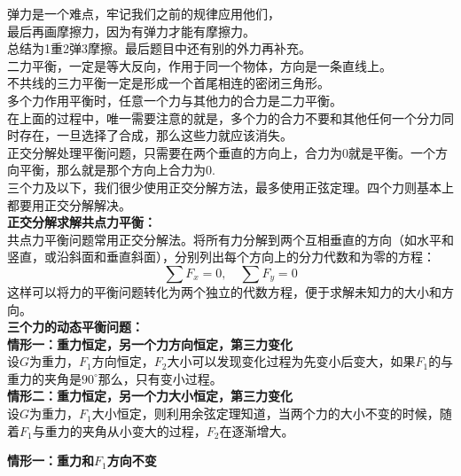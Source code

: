 \documentclass[a4paper, landscape, 10pt, twocolumn]{article}
\begin{document}
弹力是一个难点，牢记我们之前的规律应用他们，\\
最后再画摩擦力，因为有弹力才能有摩擦力。\\
总结为1重2弹3摩擦。最后题目中还有别的外力再补充。\\
二力平衡，一定是等大反向，作用于同一个物体，方向是一条直线上。\\
不共线的三力平衡一定是形成一个首尾相连的密闭三角形。\\
多个力作用平衡时，任意一个力与其他力的合力是二力平衡。\\
在上面的过程中，唯一需要注意的就是，多个力的合力不要和其他任何一个分力同时存在，一旦选择了合成，那么这些力就应该消失。\\
正交分解处理平衡问题，只需要在两个垂直的方向上，合力为0就是平衡。一个方向平衡，那么就是那个方向上合力为0.\\
三个力及以下，我们很少使用正交分解方法，最多使用正弦定理。四个力则基本上都要用正交分解解决。\\
\textbf{正交分解求解共点力平衡：}\\
共点力平衡问题常用正交分解法。将所有力分解到两个互相垂直的方向（如水平和竖直，或沿斜面和垂直斜面），分别列出每个方向上的分力代数和为零的方程：
\[
  \sum F_x = 0,\quad \sum F_y = 0
\]
这样可以将力的平衡问题转化为两个独立的代数方程，便于求解未知力的大小和方向。\\
\textbf{三个力的动态平衡问题：}\\
\textbf{情形一：重力恒定，另一个力方向恒定，第三力变化}\\
设$G$为重力，$F_1$方向恒定，$F_2$大小可以发现变化过程为先变小后变大，如果$F_1$的与重力的夹角是$90^\circ$那么，只有变小过程。\\
\textbf{情形二：重力恒定，另一个力大小恒定，第三力变化}\\
设$G$为重力，$F_1$大小恒定，则利用余弦定理知道，当两个力的大小不变的时候，随着$F_1$与重力的夹角从小变大的过程，$F_2$在逐渐增大。\\
\begin{minipage}{0.48\columnwidth}
  \centering
  \textbf{情形一：重力和$F_1$方向不变}\\
\end{minipage}
\end{document}
